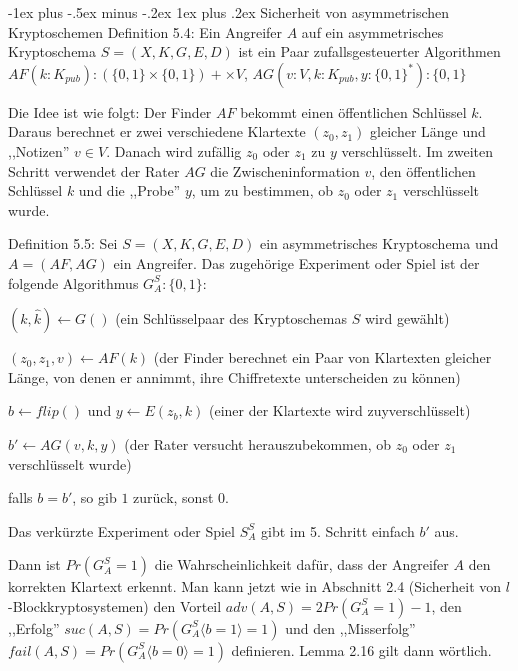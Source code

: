 \documentclass[a4paper]{article}
\makeatletter
\renewcommand{\subsubsection}{\@startsection{subsubsection}{3}{0mm}%
 {-1ex plus -.5ex minus -.2ex}%
 {1ex plus .2ex}%
 {\normalfont\small\bfseries}}
\makeatother
\begin{document}
\begin{multicols}{3}
        \subsubsection{Sicherheit von asymmetrischen Kryptoschemen}
        Definition 5.4: Ein Angreifer $A$ auf ein asymmetrisches Kryptoschema $S= (X,K,G,E,D)$ ist ein Paar zufallsgesteuerter Algorithmen $AF(k:K_{pub}):(\{0,1\}\times\{0,1\})+\times V$, $AG(v:V,k:K_{pub}, y:\{0,1\}^*) :\{0,1\}$

        Die Idee ist wie folgt: Der Finder $AF$ bekommt einen öffentlichen Schlüssel $k$. Daraus berechnet er zwei verschiedene Klartexte $(z_0,z_1)$ gleicher Länge und ,,Notizen'' $v\in V$. Danach wird zufällig $z_0$ oder $z_1$ zu $y$ verschlüsselt. Im zweiten Schritt verwendet der Rater $AG$ die Zwischeninformation $v$, den öffentlichen Schlüssel $k$ und die ,,Probe'' $y$, um zu bestimmen, ob $z_0$ oder $z_1$ verschlüsselt wurde.

        Definition 5.5: Sei $S=(X,K,G,E,D)$ ein asymmetrisches Kryptoschema und $A=(AF,AG)$ ein Angreifer. Das zugehörige Experiment oder Spiel ist der folgende Algorithmus $G^S_A:\{0,1\}$:
        \begin{enumerate*}
            \item  $(k,\hat{k})\leftarrow G()$ (ein Schlüsselpaar des Kryptoschemas $S$ wird gewählt)
            \item $(z_0,z_1,v)\leftarrow AF(k)$ (der Finder berechnet ein Paar von Klartexten gleicher Länge, von denen er annimmt, ihre Chiffretexte unterscheiden zu können)
            \item  $b\leftarrow flip()$ und $y\leftarrow E(z_b,k)$ (einer der Klartexte wird zuyverschlüsselt)
            \item  $b'\leftarrow AG(v,k,y)$ (der Rater versucht herauszubekommen, ob $z_0$ oder $z_1$ verschlüsselt wurde)
            \item  falls $b=b'$, so gib $1$ zurück, sonst $0$.
            \begin{itemize*}
                \item Das verkürzte Experiment oder Spiel $S^S_A$ gibt im 5. Schritt einfach $b'$ aus.
            \end{itemize*}
        \end{enumerate*}

        Dann ist $Pr(G^S_A= 1)$ die Wahrscheinlichkeit dafür, dass der Angreifer $A$ den korrekten Klartext erkennt. Man kann jetzt wie in Abschnitt 2.4 (Sicherheit von $l$-Blockkryptosystemen) den Vorteil $adv(A,S) = 2 Pr(G^S_A = 1)- 1$, den ,,Erfolg'' $suc(A,S) = Pr(G^S_A\langle b = 1\rangle  = 1)$ und den ,,Misserfolg'' $fail(A,S) =Pr(G^S_A\langle b= 0\rangle = 1)$ definieren. Lemma 2.16 gilt dann wörtlich.


\end{multicols}
\end{document}
